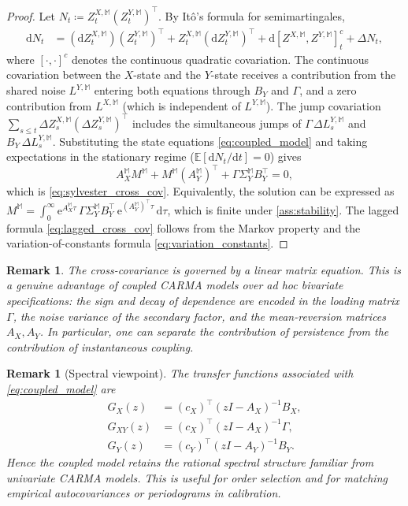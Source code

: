 \documentclass[10pt,reqno]{amsart}
\newtheorem{remark}[theorem]{Remark}
\newcommand{\1}{\mathbbm{1}}
\newcommand{\dd}{\mathrm{d}}
\newcommand{\ee}{\mathrm{e}}
\begin{document}
\begin{proof}
Let $N_t \coloneqq Z_t^{X,\mathbb{M}}(Z_t^{Y,\mathbb{M}})^\top$. By Itô's
formula for semimartingales,
\begin{align*}
  \dd N_t
  &= (\dd Z_t^{X,\mathbb{M}})(Z_t^{Y,\mathbb{M}})^\top
     + Z_t^{X,\mathbb{M}}(\dd Z_t^{Y,\mathbb{M}})^\top
     + \dd [Z^{X,\mathbb{M}}, Z^{Y,\mathbb{M}}]_t^c + \Delta N_t,
\end{align*}
where $[{\cdot},{\cdot}]^c$ denotes the continuous quadratic covariation.
The continuous covariation between the $X$-state and the $Y$-state receives
a contribution from the shared noise $L^{Y,\mathbb{M}}$ entering both
equations through $B_Y$ and $\Gamma$, and a zero contribution from
$L^{X,\mathbb{M}}$ (which is independent of $L^{Y,\mathbb{M}}$). The jump
covariation $\sum_{s \le t}\Delta Z_s^{X,\mathbb{M}}
(\Delta Z_s^{Y,\mathbb{M}})^\top$ includes the simultaneous jumps of
$\Gamma\,\Delta L_s^{Y,\mathbb{M}}$ and $B_Y\,\Delta L_s^{Y,\mathbb{M}}$.
Substituting the state equations \eqref{eq:coupled_model} and taking
expectations in the stationary regime
($\mathbb{E}[\dd N_t/\dd t] = 0$) gives
$$
  A_X^{\mathbb{M}} M^{\mathbb{M}}
  + M^{\mathbb{M}} (A_Y^{\mathbb{M}})^\top
  + \Gamma \Sigma_Y^{\mathbb{M}} B_Y^\top
  = 0,
$$
which is \eqref{eq:sylvester_cross_cov}. Equivalently, the solution can be
expressed as
$M^{\mathbb{M}} = \int_0^\infty \ee^{A_X^{\mathbb{M}} \tau}\,
\Gamma \Sigma_Y^{\mathbb{M}} B_Y^\top\,
\ee^{(A_Y^{\mathbb{M}})^\top \tau}\,\dd\tau$,
which is finite under \ref{ass:stability}. The lagged
formula \eqref{eq:lagged_cross_cov} follows from the Markov property and the
variation-of-constants formula \eqref{eq:variation_constants}.
\end{proof}

\begin{remark}
The cross-covariance is governed by a linear matrix equation. This is a genuine
advantage of coupled CARMA models over ad hoc bivariate specifications: the sign
and decay of dependence are encoded in the loading matrix $\Gamma$, the noise
variance of the secondary factor, and the mean-reversion matrices
$A_X, A_Y$. In particular, one can separate the contribution of persistence
from the contribution of instantaneous coupling.
\end{remark}

\begin{remark}[Spectral viewpoint]
The transfer functions associated with \eqref{eq:coupled_model} are
\begin{align*}
  G_X(z) &= (c_X)^\top (zI-A_X)^{-1} B_X,\\
  G_{XY}(z) &= (c_X)^\top (zI-A_X)^{-1} \Gamma,\\
  G_Y(z) &= (c_Y)^\top (zI-A_Y)^{-1} B_Y.
\end{align*}
Hence the coupled model retains the rational spectral structure familiar from
univariate CARMA models. This is useful for order selection and for matching
empirical autocovariances or periodograms in calibration.
\end{remark}
\end{document}

